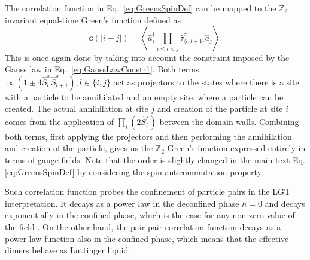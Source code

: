 \documentclass[pra,aps,showpacs,groupedaddress,superscriptaddress,twocolumn,toc=flat,biblatex,footinbib]{revtex4-1}
\renewcommand{\l}{\left(}
\renewcommand{\r}{\right)}
\renewcommand{\a}{\hat{a}}
\newcommand{\ad}{\hat{a}^\dagger}
\newcommand{\Zt}{$\mathbb{Z}_2$ }
\renewcommand{\vec}[1]{\bm{#1}}
\begin{document}
The correlation function in Eq.~\eqref{eq:GreensSpinDef} can be mapped to the \Zt invariant equal-time Green's function defined as
\begin{equation}
    {\vec{c}(|i-j|) = \left \langle \ad_i \prod_{i \leq l < j} \hat{\tau}^{z}_{\langle l, l+1 \rangle} \a_j \right \rangle}.
\end{equation}
This is once again done by taking into account the constraint imposed by the Gauss law in Eq.~\eqref{eq:GaussLawConstr1}.
Both terms  $\propto \l 1 \pm 4\hat{S}^{x}_{l}\hat{S}^{x}_{l+1}\r, l \in \{i, j \}$ act as projectors to the states where there is a site with a particle to be annihilated and an empty site, where a particle can be created. The actual annihilation at site $j$ and creation of the particle at site $i$ comes from the application of $\prod_l \l 2 \hat{S}^{z}_l \r$ between the domain walls. Combining both terms, first applying the projectors and then performing the annihilation and creation of the particle, gives us the \Zt Green's function expressed entirely in terms of gauge fields.
Note that the order is slightly changed in the main text Eq.\eqref{eq:GreensSpinDef} by considering the spin anticommutation property.


Such correlation function probes the confinement of particle pairs in the LGT interpretation. It decays as a power law in the deconfined phase $h = 0$ and decays exponentially in the confined phase, which is the case for any non-zero value of the field \cite{Borla2020, Kebric2021}. On the other hand, the pair-pair correlation function decays as a power-law function also in the confined phase, which means that the effective dimers behave as Luttinger liquid \cite{Borla2020}.
\end{document}
